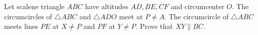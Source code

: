 Let scalene triangle $ABC$ have altitudes $AD, BE, CF$ and circumcenter $O$. The circumcircles of $\triangle ABC$ and $\triangle ADO$ meet at $P \ne A$. The circumcircle of $\triangle ABC$ meets lines $PE$ at $X \ne P$ and $PF$ at $Y \ne P$. Prove that $XY \parallel BC$.

